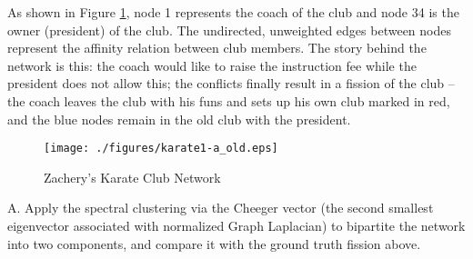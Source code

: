 \documentclass[11pt]{article}
\begin{document}
As shown in Figure \ref{fig:karate}, node 1 represents the coach of the club and node 34 is the owner (president) of the club. The undirected, unweighted edges between nodes represent
the affinity relation between club members. The story behind the network is this: the coach would like to raise the instruction fee while the president does not allow this; the conflicts finally result in a fission of the club -- the coach leaves the club with his funs and sets up his own club marked in red, and the blue nodes remain in the old club with the president.  
\begin{figure}[h]
\centering
\texttt{[image: ./figures/karate1-a\_old.eps]}
\caption{Zachery's Karate Club Network}\label{fig:karate}
\end{figure}

A. Apply the spectral clustering via the Cheeger vector (the second smallest eigenvector associated with normalized Graph Laplacian) to bipartite the network into two components, and compare it with the ground truth fission above.  
\end{document}
